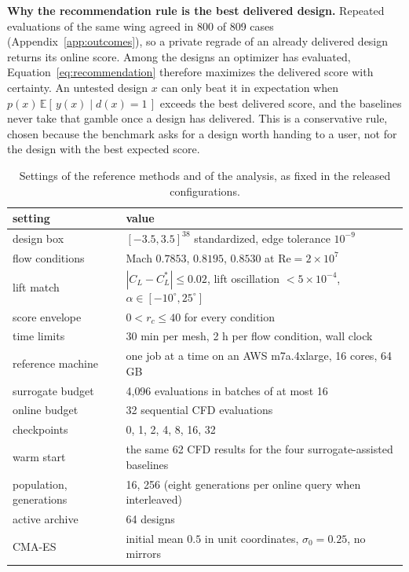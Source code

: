 \textbf{Why the recommendation rule is the best delivered design.} Repeated
evaluations of the same wing agreed in 800 of 809 cases
(Appendix~\ref{app:outcomes}), so a private regrade of an already delivered
design returns its online score. Among the designs an optimizer has evaluated,
Equation~\ref{eq:recommendation} therefore maximizes the delivered score with
certainty. An untested design $x$ can only beat it in expectation when
$p(x)\, \mathbb{E}[\, y(x) \mid d(x) = 1 \,]$ exceeds the best delivered score,
and the baselines never take that gamble once a design has delivered. This is
a conservative rule, chosen because the benchmark asks for a design worth
handing to a user, not for the design with the best expected score.

\begin{table}[H]
\caption{Settings of the reference methods and of the analysis, as fixed in
the released configurations.}
\label{tab:app-settings}
\centering
\scriptsize
\begin{tabular*}{\textwidth}{@{\extracolsep{\fill}}ll}
\toprule
setting & value \\
\midrule
design box & $[-3.5, 3.5]^{38}$ standardized, edge tolerance $10^{-9}$ \\
flow conditions & Mach $0.7853$, $0.8195$, $0.8530$ at $\mathrm{Re} = 2 \times 10^{7}$ \\
lift match & $|C_L - C_L^{*}| \le 0.02$, lift oscillation $< 5 \times 10^{-4}$, $\alpha \in [-10^{\circ}, 25^{\circ}]$ \\
score envelope & $0 < r_c \le 40$ for every condition \\
time limits & 30 min per mesh, 2 h per flow condition, wall clock \\
reference machine & one job at a time on an AWS m7a.4xlarge, 16 cores, 64 GB \\
surrogate budget & 4{,}096 evaluations in batches of at most 16 \\
online budget & 32 sequential CFD evaluations \\
checkpoints & 0, 1, 2, 4, 8, 16, 32 \\
warm start & the same 62 CFD results for the four surrogate-assisted baselines \\
population, generations & 16, 256 (eight generations per online query when interleaved) \\
active archive & 64 designs \\
CMA-ES & initial mean $0.5$ in unit coordinates, $\sigma_0 = 0.25$, no mirrors \\

\end{tabular*}
\end{table}
